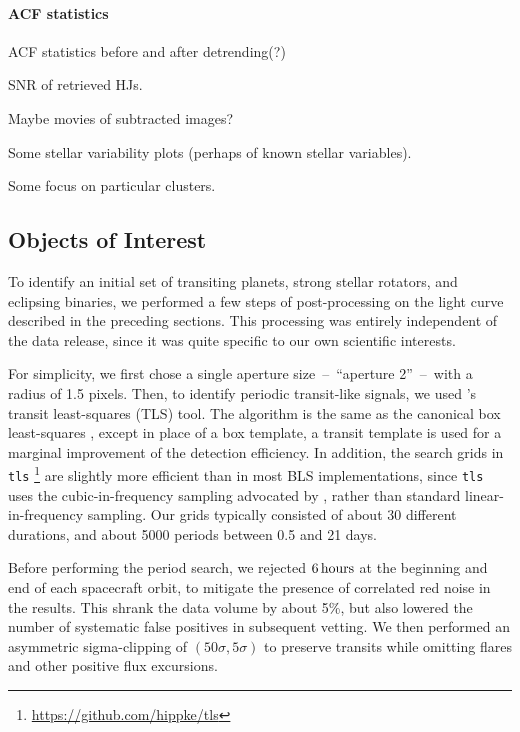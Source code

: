 \documentclass[12pt,twocolumn,tighten]{aastex62}
\begin{document}
\paragraph{ACF statistics}
ACF statistics before and after detrending(?)

SNR of retrieved HJs.

Maybe movies of subtracted images?

Some stellar variability plots (perhaps of known stellar variables).

Some focus on particular clusters.

\subsection{Objects of Interest}
\label{subsec:ctois}

To identify an initial set of transiting planets, strong stellar rotators, and 
eclipsing binaries, we performed a few steps of post-processing on the light 
curve described in the preceding sections. 
This processing was entirely independent of the data release, since it was 
quite specific to our own scientific interests.

For simplicity,
we first chose a single aperture size~--~``aperture 2''~--~with a radius of 
1.5  pixels.
Then, to identify periodic transit-like signals, we used 
\citet{hippke_TLS_2019}'s transit least-squares (TLS) tool.
The algorithm is the same as the canonical box least-squares
\citep{kovacs_box-fitting_2002}, except in place of a box template, a transit 
template is used  for a marginal improvement of the detection efficiency.
In addition, the search grids in \texttt{tls} 
\footnote{\url{https://github.com/hippke/tls}} are slightly more 
efficient than in most BLS implementations, since \texttt{tls} uses the 
cubic-in-frequency sampling advocated by \citet{ofir_optimizing_2014}, 
rather than standard linear-in-frequency sampling.
Our grids typically consisted of about 30 different durations, and
about 5000 periods between 0.5 and 21 days. 

Before performing the period search, we rejected $6\,{\rm hours}$ at the
beginning and end of each spacecraft orbit, to mitigate the presence
of correlated red noise in the results.
This shrank the data volume by about 5\%, but also lowered the number
of systematic false positives in subsequent vetting.
We then performed an asymmetric sigma-clipping of $(50\sigma,5\sigma)$ to 
preserve transits while omitting flares and other positive flux excursions. 
\end{document}

